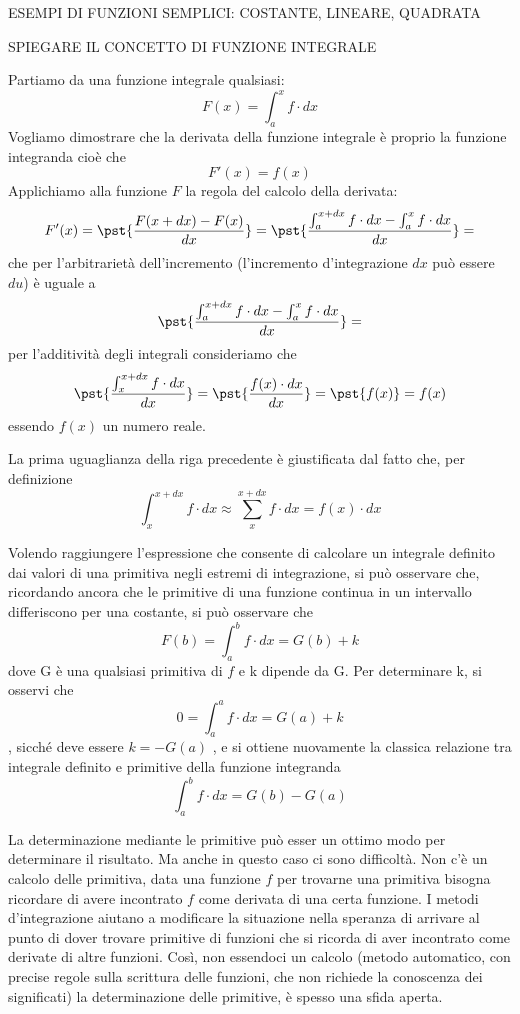 ESEMPI DI FUNZIONI SEMPLICI: COSTANTE, LINEARE, QUADRATA %

SPIEGARE IL CONCETTO DI FUNZIONE INTEGRALE %

Partiamo da una funzione integrale qualsiasi: 
\[F(x) = \int_a^x f \cdot dx\]
Vogliamo dimostrare che la derivata della funzione integrale è proprio la 
funzione integranda cioè che  
\[F'(x) = f(x)\]
Applichiamo alla funzione \(F\) la regola del calcolo della derivata:
\[F'(x) = \pst{\frac{F(x+dx)-F(x)}{dx}} = 
\pst{\frac{\int_a^{x+dx} f \cdot dx - \int_a^x f \cdot dx}{dx}} =\] 
che per l'arbitrarietà dell'incremento (l'incremento d'integrazione \(dx\) 
può essere \(du\)) è uguale a
\[\pst{\frac{\int_a^{x+dx} f \cdot dx - \int_a^x f \cdot dx}{dx}} =\]
per l'additività degli integrali consideriamo che
\[\pst{\frac{\int_x^{x+dx} f \cdot dx}{dx}} = 
    \pst{\frac{f(x) \cdot dx}{dx}} = \pst{f(x)} = f(x)\]
essendo \(f(x)\) un numero reale. 

La prima uguaglianza della riga
precedente è giustificata dal fatto che, per definizione 
\[\int_x^{x+dx} f \cdot dx \approx \sum_x^{x+dx} f \cdot dx = f(x) \cdot dx\]

Volendo raggiungere l'espressione che consente di calcolare un integrale 
definito dai valori di una primitiva negli estremi di integrazione, si può 
osservare che, ricordando ancora che le primitive di una funzione continua in 
un intervallo differiscono per una costante, si può osservare che
\[F(b) = \int_a^b f \cdot dx = G(b) + k\]
dove G è una qualsiasi primitiva di \(f\) e k dipende da G. Per determinare k, 
si osservi che
\[0 = \int_a^a f \cdot dx = G(a) + k\],
sicché deve essere \(k = - G(a)\) , e si ottiene nuovamente la classica 
relazione tra integrale definito e primitive della funzione integranda 
\[\int_a^b f \cdot dx = G(b) - G(a)\]

La determinazione mediante le primitive può esser un ottimo modo per 
determinare il risultato. Ma anche in questo caso ci sono difficoltà. Non c'è 
un calcolo delle primitiva, data una funzione \(f\) per trovarne una 
primitiva bisogna ricordare di avere incontrato \(f\) come derivata di una 
certa funzione. 
I metodi d'integrazione aiutano a modificare la situazione nella speranza di 
arrivare al punto di dover trovare primitive di funzioni che si ricorda di 
aver incontrato come derivate di altre funzioni. Così, non 
essendoci un calcolo (metodo automatico, con precise regole sulla scrittura 
delle funzioni, che non richiede la conoscenza dei significati) la 
determinazione delle primitive, è spesso una sfida aperta.

